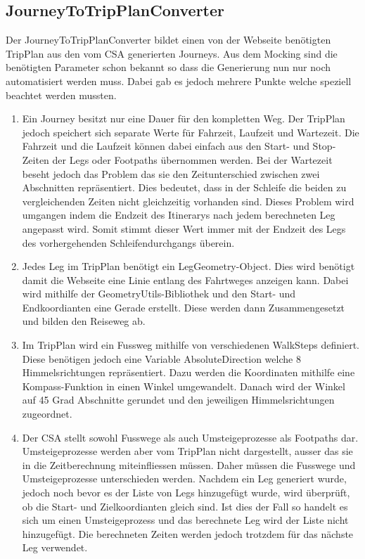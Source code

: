 \subsection{JourneyToTripPlanConverter}
Der JourneyToTripPlanConverter bildet einen von der Webseite benötigten TripPlan aus den vom CSA generierten Journeys. Aus dem Mocking sind die benötigten Parameter schon bekannt so dass die Generierung nun nur noch automatisiert werden muss. Dabei gab es jedoch mehrere Punkte welche speziell beachtet werden mussten.
\begin{enumerate}
	\item Ein Journey besitzt nur eine Dauer für den kompletten Weg. Der TripPlan jedoch speichert sich separate Werte für Fahrzeit, Laufzeit und Wartezeit. Die Fahrzeit und die Laufzeit können dabei einfach aus den Start- und Stop-Zeiten der Legs oder Footpaths übernommen werden. Bei der Wartezeit beseht jedoch das Problem das sie den Zeitunterschied zwischen zwei Abschnitten repräsentiert. Dies bedeutet, dass in der Schleife die beiden zu vergleichenden Zeiten nicht gleichzeitig vorhanden sind. Dieses Problem wird umgangen indem die Endzeit des Itinerarys nach jedem berechneten Leg angepasst wird. Somit stimmt dieser Wert immer mit der Endzeit des Legs des vorhergehenden Schleifendurchgangs überein. 
	\item Jedes Leg im TripPlan benötigt ein LegGeometry-Object. Dies wird benötigt damit die Webseite eine Linie entlang des Fahrtweges anzeigen kann. Dabei wird mithilfe der GeometryUtils-Bibliothek und den Start- und Endkoordianten eine Gerade erstellt. Diese werden dann Zusammengesetzt und bilden den Reiseweg ab.
	\item Im TripPlan wird ein Fussweg mithilfe von verschiedenen WalkSteps definiert. Diese benötigen jedoch eine Variable AbsoluteDirection welche 8 Himmelsrichtungen repräsentiert. Dazu werden die Koordinaten mithilfe eine Kompass-Funktion in einen Winkel umgewandelt. Danach wird der Winkel auf 45 Grad Abschnitte gerundet und den jeweiligen Himmelsrichtungen zugeordnet.
	\item Der CSA stellt sowohl Fusswege als auch Umsteigeprozesse als Footpaths dar. Umsteigeprozesse werden aber vom TripPlan nicht dargestellt, ausser das sie in die Zeitberechnung miteinfliessen müssen. Daher müssen die Fusswege und Umsteigeprozesse unterschieden werden. Nachdem ein Leg generiert wurde, jedoch noch bevor es der Liste von Legs hinzugefügt wurde, wird überprüft, ob die Start- und Zielkoordianten gleich sind. Ist dies der Fall so handelt es sich um einen Umsteigeprozess und das berechnete Leg wird der Liste nicht hinzugefügt. Die berechneten Zeiten werden jedoch trotzdem für das nächste Leg verwendet.
\end{enumerate}

